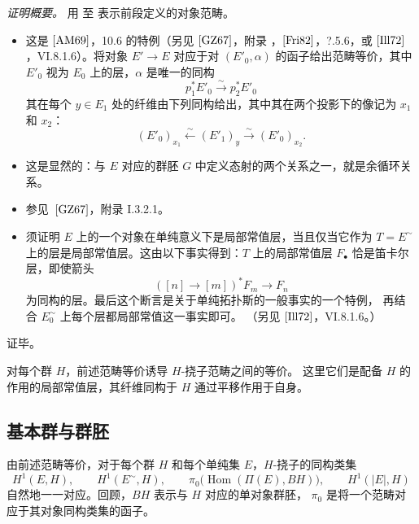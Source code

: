\medskip
\noindent\emph{证明概要。}
用  至
 表示前段定义的对象范畴。

\begin{itemize}
\item[\((1)\Longleftrightarrow(5)\).]
  这是 \([{\rm AM69}]\)，10.6 的特例（另见 \([{\rm GZ67}]\)，附录
  ，\([{\rm Fri82}]\)，?.5.6，或
  \([{\rm Ill72}]\)，VI.8.1.6）。将对象 \(E'\to E\) 对应于对 \((E'_0,\alpha)\)
  的函子给出范畴等价，其中 \(E'_0\) 视为 \(E_0\) 上的层，\(\alpha\) 是唯一的同构
  \[
    p_1^*E'_0\xrightarrow{\sim}p_2^*E'_0
  \]
  其在每个 \(y\in E_1\) 处的纤维由下列同构给出，其中其在两个投影下的像记为
  \(x_1\) 和 \(x_2\)：
  \[
    (E'_0)_{x_1}\xleftarrow{\sim}(E'_1)_y
      \xrightarrow{\sim}(E'_0)_{x_2}.
  \]
\item[\(\SGAInlineRefTarget{sga3:x:proposition:9-3-1:item:5}(5)\Longleftrightarrow(3)\).]
  这是显然的：与 \(E\) 对应的群胚 \(G\) 中定义态射的两个关系之一，就是余循环关系。
\item[\((1)\Longleftrightarrow(4)\).]
  参见\ \([{\rm GZ67}]\)，附录 I.3.2.1。
\item[\(\SGAInlineRefTarget{sga3:x:proposition:9-3-1:item:1:03}(1)\Longleftrightarrow(2)\).]
  须证明 \(E\) 上的一个对象在单纯意义下是局部常值层，当且仅当它作为
  \(T=E^{\sim}\) 上的层是局部常值层。这由以下事实得到：\(T\) 上的局部常值层
  \(F_\bullet\) 恰是笛卡尔层，即使箭头
  \[
    ([n]\to[m])^*F_m\longrightarrow F_n
  \]
  为同构的层。最后这个断言是关于单纯拓扑斯的一般事实的一个特例，
  再结合 \(E_0^{\sim}\) 上每个层都局部常值这一事实即可。
  （另见 \([{\rm Ill72}]\)，VI.8.1.6。）
\end{itemize}
\hfill 证毕。

对每个群 \(H\)，前述范畴等价诱导 \(H\)-挠子范畴之间的等价。
这里它们是配备 \(H\) 的作用的局部常值层，其纤维同构于 \(H\) 通过平移作用于自身。

\subsection{基本群与群胚}

由前述范畴等价，对于每个群 \(H\) 和每个单纯集 \(E\)，\(H\)-挠子的同构类集
\[
  H^1(E,H),\qquad
  H^1(E^{\sim},H),\qquad
  \pi_0\bigl(\operatorname{Hom}(\Pi(E),BH)\bigr),\qquad
  H^1(|E|,H)
\]
自然地一一对应。回顾，\(BH\) 表示与 \(H\) 对应的单对象群胚，
\(\pi_0\) 是将一个范畴对应于其对象同构类集的函子。

